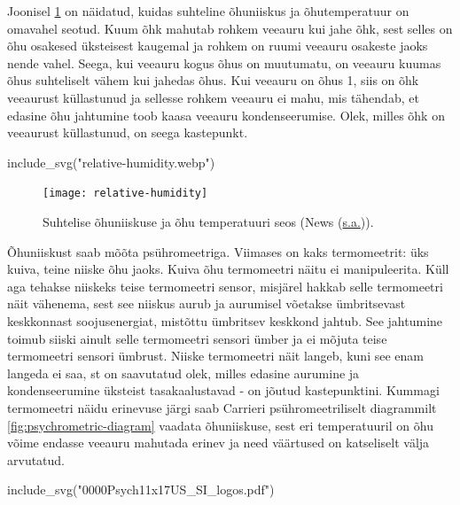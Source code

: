 \documentclass[
  12pt,
  a4paper,
  onecolumn, twoside]{article}
\newenvironment{Shaded}{\begin{snugshade}}{\end{snugshade}}
\newcommand{\FunctionTok}[1]{\textcolor[rgb]{0.00,0.00,0.00}{#1}}
\newcommand{\NormalTok}[1]{#1}
\newcommand{\StringTok}[1]{\textcolor[rgb]{0.31,0.60,0.02}{#1}}
\begin{document}
Joonisel \ref{fig:relative-humidity} on näidatud, kuidas suhteline õhuniiskus ja õhutemperatuur on omavahel seotud. Kuum õhk mahutab rohkem veeauru kui jahe õhk, sest selles on õhu osakesed üksteisest kaugemal ja rohkem on ruumi veeauru osakeste jaoks nende vahel. Seega, kui veeauru kogus õhus on muutumatu, on veeauru kuumas õhus suhteliselt vähem kui jahedas õhus. Kui veeauru on õhus 1, siis on õhk veeaurust küllastunud ja sellesse rohkem veeauru ei mahu, mis tähendab, et edasine õhu jahtumine toob kaasa veeauru kondenseerumise. Olek, milles õhk on veeaurust küllastunud, on seega kastepunkt.



\begin{Shaded}
\begin{Highlighting}[numbers=left,,]
\FunctionTok{include\_svg}\NormalTok{(}\StringTok{"relative{-}humidity.webp"}\NormalTok{)}
\end{Highlighting}
\end{Shaded}

\begin{figure}
\texttt{[image: relative-humidity]} \caption{Suhtelise õhuniiskuse ja õhu temperatuuri seos (News (\protect\hyperlink{ref-news_september}{s.a.})).}\label{fig:relative-humidity}
\end{figure}

Õhuniiskust saab mõõta psühromeetriga. Viimases on kaks termomeetrit: üks kuiva, teine niiske õhu jaoks. Kuiva õhu termomeetri näitu ei manipuleerita. Küll aga tehakse niiskeks teise termomeetri sensor, misjärel hakkab selle termomeetri näit vähenema, sest see niiskus aurub ja aurumisel võetakse ümbritsevast keskkonnast soojusenergiat, mistõttu ümbritsev keskkond jahtub. See jahtumine toimub siiski ainult selle termomeetri sensori ümber ja ei mõjuta teise termomeetri sensori ümbrust. Niiske termomeetri näit langeb, kuni see enam langeda ei saa, st on saavutatud olek, milles edasine aurumine ja kondenseerumine üksteist tasakaalustavad - on jõutud kastepunktini. Kummagi termomeetri näidu erinevuse järgi saab Carrieri psühromeetriliselt diagrammilt \ref{fig:psychrometric-diagram} vaadata õhuniiskuse, sest eri temperatuuril on õhu võime endasse veeauru mahutada erinev ja need väärtused on katseliselt välja arvutatud.



\begin{Shaded}
\begin{Highlighting}[numbers=left,,]
\FunctionTok{include\_svg}\NormalTok{(}\StringTok{"0000Psych11x17US\_SI\_logos.pdf"}\NormalTok{)}
\end{Highlighting}
\end{Shaded}
\end{document}
